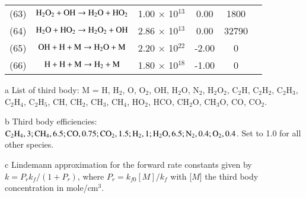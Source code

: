 \documentclass{warpdoc}
\begin{document}
\begin{table}[h]
\begin{center}
\begin{threeparttable}
\begin{tabular}{cccccc}
(63) & $\rm H_2 O_2 + OH \rightarrow H_2 O + H O_2 $ &1.00 $\times$ 10$^{13}$  &0.00 &1800&\cite{rkm:1991:smoke}\\

(64) & $\rm H_2 O + H O_2  \rightarrow H_2 O_2 + OH $ &2.86 $\times$ 10$^{13}$  &0.00 &32790&\cite{rkm:1991:smoke}\\

(65) & $\rm OH + H+ M  \rightarrow H_2 O +M $ &2.20 $\times$ 10$^{22}$  &-2.00 &0&\cite{rkm:1991:smoke}\\

(66) & $\rm H + H+ M  \rightarrow H_2  +M $ &1.80 $\times$ 10$^{18}$  &-1.00 &0&\cite{rkm:1991:smoke}\\

\bottomrule
\end{tabular}
\label{tab:park}
\begin{tablenotes}
\item[{a}] List of third body: M = H, H$_2$, O, O$_2$, OH, H$_2$O, N$_2$, H$_2$O$_2$,
   C$_2$H, C$_2$H$_2$, C$_2$H$_3$, C$_2$H$_4$, C$_2$H$_5$, CH, CH$_2$, 
   CH$_3$, CH$_4$, HO$_2$, HCO, CH$_2$O, CH$_3$O, CO, CO$_2$.
\item[{b}] Third body efficiencies: $\rm C_2 H_4, 3; CH_4, 6.5; CO, 0.75; C O_2, 1.5; H_2, 1; H_2 O, 6.5; N_2, 0.4; O_2, 0.4$. Set to 1.0 for all other species.
\item[{c}] Lindemann approximation for the forward
rate constants given by $k = P_r k_f / (1+P_r)$, where $P_r = k_{f0}[M]/k_f$ with [$M$] the third body concentration in mole/cm$^3$.


\end{tablenotes}
\end{threeparttable}
\end{center}
\end{table} 
%
\clearpage


\end{document}
